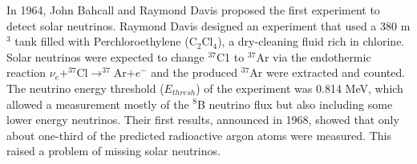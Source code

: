 In 1964, John Bahcall and Raymond Davis proposed the first experiment to detect solar neutrinos\cite{bahcall1964solar,davis1964solar}. Raymond Davis designed an experiment that used a 380 m$^3$ tank filled with Perchloroethylene (C$_2$Cl$_4$), a dry-cleaning fluid rich in chlorine. Solar neutrinos were expected to change $^{37}$C1 to $^{37}$Ar via the endothermic reaction $\nu_e+^{37}$Cl$\to^{37}$Ar$+e^-$ and the produced $^{37}$Ar were extracted and counted. The neutrino energy threshold ($E_{thresh}$) of the experiment was 0.814 MeV, which allowed a measurement mostly of the $^8$B neutrino flux but also including some lower energy neutrinos\cite{davis1964solar}. Their first results, announced in 1968, showed that only about one-third of the predicted radioactive argon atoms were measured. This raised a problem of missing solar neutrinos.


